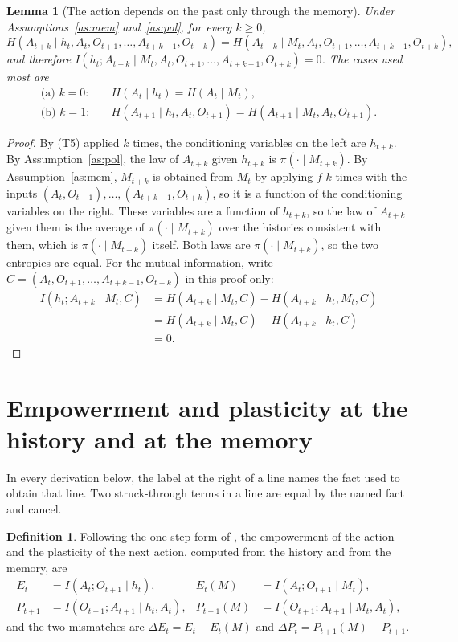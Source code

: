 \documentclass{article}
\newtheorem{lemma}[proposition]{Lemma}
\theoremstyle{definition}
\newtheorem{definition}[proposition]{Definition}
\theoremstyle{remark}
\newcommand{\dE}{\Delta E}
\newcommand{\dP}{\Delta P}
\newcommand{\why}[1]{\tag*{\small(#1)}}
\begin{document}
\begin{lemma}[The action depends on the past only through the memory]\label{lem:action}
Under Assumptions~\ref{as:mem} and~\ref{as:pol}, for every $k\ge0$,
\[
H(A_{t+k}\mid h_t,A_t,O_{t+1},\dots,A_{t+k-1},O_{t+k})=H(A_{t+k}\mid M_t,A_t,O_{t+1},\dots,A_{t+k-1},O_{t+k}),
\]
and therefore $I(h_t;A_{t+k}\mid M_t,A_t,O_{t+1},\dots,A_{t+k-1},O_{t+k})=0$. The cases used most are
\begin{align*}
\text{(a) } k=0:&\quad H(A_t\mid h_t)=H(A_t\mid M_t),\\
\text{(b) } k=1:&\quad H(A_{t+1}\mid h_t,A_t,O_{t+1})=H(A_{t+1}\mid M_t,A_t,O_{t+1}).
\end{align*}
\end{lemma}

\begin{proof}
By (T5) applied $k$ times, the conditioning variables on the left are $h_{t+k}$. By Assumption~\ref{as:pol}, the law of $A_{t+k}$ given $h_{t+k}$ is $\pi(\cdot\mid M_{t+k})$. By Assumption~\ref{as:mem}, $M_{t+k}$ is obtained from $M_t$ by applying $f$ $k$ times with the inputs $(A_t,O_{t+1}),\dots,(A_{t+k-1},O_{t+k})$, so it is a function of the conditioning variables on the right. These variables are a function of $h_{t+k}$, so the law of $A_{t+k}$ given them is the average of $\pi(\cdot\mid M_{t+k})$ over the histories consistent with them, which is $\pi(\cdot\mid M_{t+k})$ itself. Both laws are $\pi(\cdot\mid M_{t+k})$, so the two entropies are equal. For the mutual information, write $C=(A_t,O_{t+1},\dots,A_{t+k-1},O_{t+k})$ in this proof only:
\begin{align*}
I(h_t;A_{t+k}\mid M_t,C)
&=H(A_{t+k}\mid M_t,C)-H(A_{t+k}\mid h_t,M_t,C) \why{T1}\\
&=H(A_{t+k}\mid M_t,C)-H(A_{t+k}\mid h_t,C) \why{T4}\\
&=0 \why{the equality of entropies above}.
\end{align*}
\end{proof}
\section{Empowerment and plasticity at the history and at the memory}\label{sec:EP}

In every derivation below, the label at the right of a line names the fact used to obtain that line. Two struck-through terms in a line are equal by the named fact and cancel.

\begin{definition}\label{def:EP}
Following the one-step form of \citet{abel2025plasticity}, the empowerment of the action and the plasticity of the next action, computed from the history and from the memory, are
\begin{align*}
E_t&=I(A_t;O_{t+1}\mid h_t), & E_t(M)&=I(A_t;O_{t+1}\mid M_t),\\
P_{t+1}&=I(O_{t+1};A_{t+1}\mid h_t,A_t), & P_{t+1}(M)&=I(O_{t+1};A_{t+1}\mid M_t,A_t),
\end{align*}
and the two mismatches are $\dE_t=E_t-E_t(M)$ and $\dP_t=P_{t+1}(M)-P_{t+1}$.
\end{definition}
\end{document}
